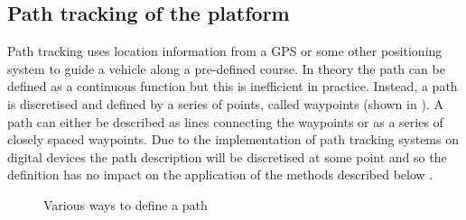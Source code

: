 \documentclass[main.tex]{subfiles}
\begin{document}
\subsection{Path tracking of the platform}
Path tracking uses location information from a GPS or some other positioning system to guide a vehicle along a pre-defined course. In theory the path can be defined as a continuous function but this is inefficient in practice. Instead, a path is discretised and defined by a series of points, called waypoints (shown in ). A path can either be described as lines connecting the waypoints or as a series of closely spaced waypoints. Due to the implementation of path tracking systems on digital devices the path description will be discretised at some point and so the definition has no impact on the application of the methods described below \parencite{Giesbrecht2005}.

\begin{figure}[htbp]
\centering
{}\hspace{1em}%
\hspace{1em}%
\caption{Various ways to define a path \parencite{Giesbrecht2005}}
\end{figure}
\end{document}

